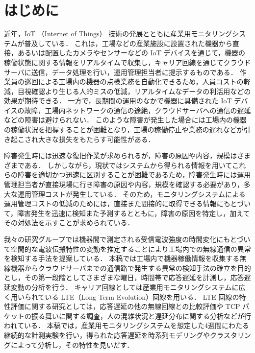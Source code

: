 \documentclass[technicalreport]{ieicej}
\begin{document}
\section{はじめに}
近年，IoT （Internet of Things） 技術の発展とともに産業用モニタリングシステム\cite{lima2012embedded}が普及している．
これは，工場などの産業施設に設置された機器から直接，あるいは配置したカメラやセンサーなどの IoT デバイスを通じて，機器の稼働状態に関する情報をリアルタイムで収集し，キャリア回線を通じてクラウドサーバに送信，データ処理を行い，運用管理担当者に提示するものである．
作業員の巡回による工場内の機器の点検業務を自動化できるため，人員コストの軽減，目視確認より生じる人的ミスの低減，リアルタイムなデータの利活用などの効果が期待できる．
一方で，長期間の運用のなかで機器に具備された IoT デバイスの故障，工場内ネットワークの通信の途絶，クラウドサーバへの通信の遅延などの障害は避けられない．
このような障害が発生した場合には工場内の機器の稼働状況を把握することが困難となり，工場の稼働停止や業務の遅れなどが引き起こされ大きな損失をもたらす可能性がある．

障害発生時には迅速な復旧作業が求められるが，障害の原因や内容，規模はさまざまである．
しかしながら，現状ではシステムから得られる情報を用いてこれらの障害を適切かつ迅速に区別することが困難であるため，障害発生時には運用管理担当者が直接現場に行き障害の原因や内容，規模を確認する必要があり，多大な運用管理コストが発生している．
そのため，モニタリングシステムによる運用管理コストの低減のためには，直接また間接的に取得できる情報にもとづいて，障害発生を迅速に検知また予測するとともに，障害の原因を特定し，加えてその対処法を示すことが求められている．

我々の研究グループでは機器間で測定される受信電波強度の時間変化にもとづいて空間的な電波伝搬特性の変動を推定することにより工場内での無線通信の異常を検知する手法を提案している\cite{prev}．
本稿では工場内で機器稼働情報を収集する無線機器からクラウドサーバまでの通信路で発生する異常の検知手法の確立を目的とし，その第一段階としてさまざまな曜日，時間帯で応答遅延を計測し，応答遅延変動の分析を行う．
キャリア回線としては産業用モニタリングシステムに広く用いられている LTE（Long Term Evolution）回線を用いる．
LTE 回線の特性評価に関する研究としては，応答遅延の他の無線回線との比較評価\cite{striegel2014lte}\cite{garcia2015delay}や TCP パケットの振る舞いに関する調査\cite{huang2013depth}，人の混雑状況と遅延分布に関する分析\cite{distribution}などが行われている．
本稿では，産業用モニタリングシステムを想定した4週間にわたる継続的な計測実験を行い，得られた応答遅延を時系列モデリングやクラスタリングによって分析し，その特性を見いだす．
\end{document}

